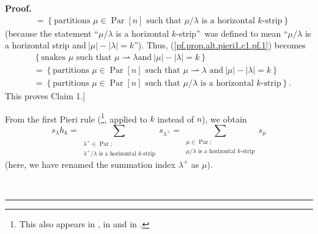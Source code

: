\documentclass[numbers=enddot,12pt,final,onecolumn,notitlepage]{scrartcl}%
\theoremstyle{definition}
\newenvironment{proof}[1][Proof]{\noindent\textbf{#1.} }{\ \rule{0.5em}{0.5em}}
\let\sumnonlimits\sum
\renewcommand{\sum}{\sumnonlimits\limits}
\newenvironment{verlong}{}{}
\begin{document}
\begin{proof}
\begin{verlong}
\begin{align*}
&  =\left\{  \text{partitions }\mu\in\operatorname*{Par}\left[  n\right]
\text{ such that }\mu/\lambda\text{ is a horizontal }k\text{-strip}\right\}
\end{align*}
(because the statement \textquotedblleft$\mu/\lambda$ is a horizontal
$k$-strip\textquotedblright\ was defined to mean \textquotedblleft$\mu
/\lambda$ is a horizontal strip and$\ \left\vert \mu\right\vert -\left\vert
\lambda\right\vert =k$\textquotedblright). Thus,
(\ref{pf.prop.alt.pieri1.c1.pf.1}) becomes%
\begin{align*}
&  \left\{  \text{snakes }\mu\text{ such that }\mu\rightharpoonup\lambda\text{
and}\ \left\vert \mu\right\vert -\left\vert \lambda\right\vert =k\right\} \\
&  =\left\{  \text{partitions }\mu\in\operatorname*{Par}\left[  n\right]
\text{ such that }\mu\rightharpoonup\lambda\text{ and}\ \left\vert
\mu\right\vert -\left\vert \lambda\right\vert =k\right\} \\
&  =\left\{  \text{partitions }\mu\in\operatorname*{Par}\left[  n\right]
\text{ such that }\mu/\lambda\text{ is a horizontal }k\text{-strip}\right\}  .
\end{align*}
This proves Claim 1.]
\end{verlong}

From the first Pieri rule (\cite[(2.7.1)]{GriRei}\footnote{This also appears
in \cite[Theorem 5.3]{MenRem15}, in \cite[Theorem 7.15.7]{Stanley-EC2} and in
\cite[Theorem 9.3]{Egge19}.}, applied to $k$ instead of $n$), we obtain%
\[
s_{\lambda}h_{k}=\sum_{\substack{\lambda^{+}\in\operatorname*{Par}%
;\\\lambda^{+}/\lambda\text{ is a horizontal }k\text{-strip}}}s_{\lambda^{+}%
}=\sum_{\substack{\mu\in\operatorname*{Par};\\\mu/\lambda\text{ is a
horizontal }k\text{-strip}}}s_{\mu}%
\]
(here, we have renamed the summation index $\lambda^{+}$ as $\mu$).


\end{proof}
\end{document}
